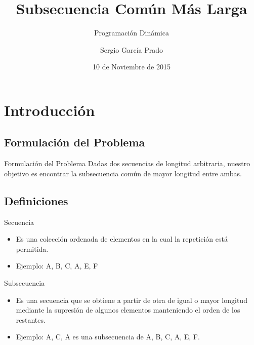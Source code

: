 \documentclass{beamer}
\title[Subsecuencia Común Más Larga]{Subsecuencia Común Más Larga}
\subtitle[Programación Dinámica]{Programación Dinámica}
\author{Sergio García Prado\\}
\date{10 de Noviembre de 2015}
\begin{document}

	\begin{frame}
		\titlepage
	\end{frame}

	
	\begin{frame}
		\tableofcontents
	\end{frame}


	\section{Introducción}

	
		\subsection{Formulación del Problema}
			\begin{frame}{Formulación del Problema}
 				Dadas dos secuencias de longitud arbitraria, nuestro objetivo es encontrar la subsecuencia común de mayor longitud entre ambas.

			\end{frame}
			
		\subsection{Definiciones}
		
		
			\begin{frame}{Secuencia}

 				\begin{itemize}
			
  					\item Es una colección ordenada de elementos en la cual la repetición está permitida.
  			
					\item Ejemplo: {A, B, C, A, E, F}

				\end{itemize}

			\end{frame}
			
			\begin{frame}{Subsecuencia}

 				\begin{itemize}
			
  					\item Es una secuencia que se obtiene a partir de otra de igual o mayor longitud mediante la supresión de algunos elementos manteniendo el orden de los restantes.
  			
					\item Ejemplo: {A, C, A} es una subsecuencia de {A, B, C, A, E, F}.
  					

				\end{itemize}

			\end{frame}
\end{document}
